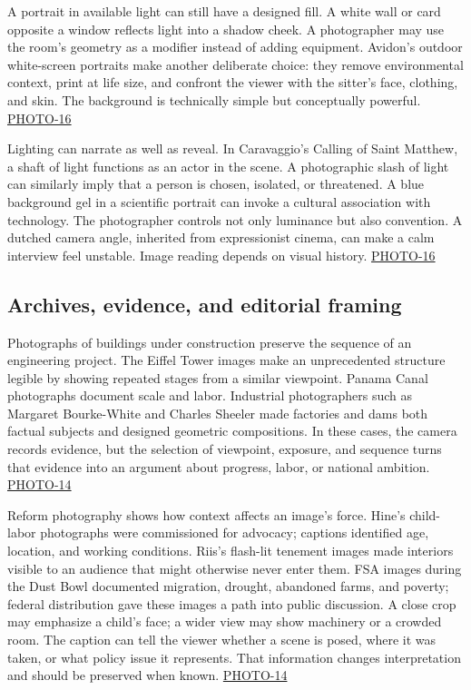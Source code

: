 A portrait in available light can still have a designed fill. A white wall or card opposite a window reflects light into a shadow cheek. A photographer may use the room's geometry as a modifier instead of adding equipment. Avidon's outdoor white-screen portraits make another deliberate choice: they remove environmental context, print at life size, and confront the viewer with the sitter's face, clothing, and skin. The background is technically simple but conceptually powerful. \hyperref[04-visual-computing-ii-ch036-photo-16---photography-session-16]{PHOTO-16}

Lighting can narrate as well as reveal. In Caravaggio's Calling of Saint Matthew, a shaft of light functions as an actor in the scene. A photographic slash of light can similarly imply that a person is chosen, isolated, or threatened. A blue background gel in a scientific portrait can invoke a cultural association with technology. The photographer controls not only luminance but also convention. A dutched camera angle, inherited from expressionist cinema, can make a calm interview feel unstable. Image reading depends on visual history. \hyperref[04-visual-computing-ii-ch036-photo-16---photography-session-16]{PHOTO-16}

\subsection{Archives, evidence, and editorial framing}\label{04-visual-computing-ii-ch034-archives-evidence-and-editorial-framing}

\hypertarget{04-visual-computing-ii-ch034-archives-evidence-and-editorial-framing}{}

Photographs of buildings under construction preserve the sequence of an engineering project. The Eiffel Tower images make an unprecedented structure legible by showing repeated stages from a similar viewpoint. Panama Canal photographs document scale and labor. Industrial photographers such as Margaret Bourke-White and Charles Sheeler made factories and dams both factual subjects and designed geometric compositions. In these cases, the camera records evidence, but the selection of viewpoint, exposure, and sequence turns that evidence into an argument about progress, labor, or national ambition. \hyperref[04-visual-computing-ii-ch036-photo-14---photography-session-14]{PHOTO-14}

Reform photography shows how context affects an image's force. Hine's child-labor photographs were commissioned for advocacy; captions identified age, location, and working conditions. Riis's flash-lit tenement images made interiors visible to an audience that might otherwise never enter them. FSA images during the Dust Bowl documented migration, drought, abandoned farms, and poverty; federal distribution gave these images a path into public discussion. A close crop may emphasize a child's face; a wider view may show machinery or a crowded room. The caption can tell the viewer whether a scene is posed, where it was taken, or what policy issue it represents. That information changes interpretation and should be preserved when known. \hyperref[04-visual-computing-ii-ch036-photo-14---photography-session-14]{PHOTO-14}

